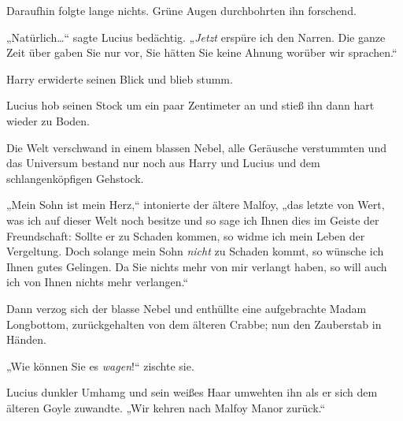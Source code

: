Daraufhin folgte lange nichts. Grüne Augen durchbohrten ihn forschend.

„Natürlich…“ sagte Lucius bedächtig. „\emph{Jetzt} erspüre ich den Narren. Die ganze Zeit über gaben Sie nur vor, Sie hätten Sie keine Ahnung worüber wir sprachen.“

Harry erwiderte seinen Blick und blieb stumm.

Lucius hob seinen Stock um ein paar Zentimeter an und stieß ihn dann hart wieder zu Boden.

Die Welt verschwand in einem blassen Nebel, alle Geräusche verstummten und das Universum bestand nur noch aus Harry und Lucius und dem schlangenköpfigen Gehstock.

„Mein Sohn ist mein Herz,“ intonierte der ältere Malfoy, „das letzte von Wert, was ich auf dieser Welt noch besitze und so sage ich Ihnen dies im Geiste der Freundschaft: Sollte er zu Schaden kommen, so widme ich mein Leben der Vergeltung. Doch solange mein Sohn \emph{nicht} zu Schaden kommt, so wünsche ich Ihnen gutes Gelingen. Da Sie nichts mehr von mir verlangt haben, so will auch ich von Ihnen nichts mehr verlangen.“

Dann verzog sich der blasse Nebel und enthüllte eine aufgebrachte Madam Longbottom, zurückgehalten von dem älteren Crabbe; nun den Zauberstab in Händen.

„Wie können Sie es \emph{wagen}!“ zischte sie.

Lucius dunkler Umhamg und sein weißes Haar umwehten ihn als er sich dem älteren Goyle zuwandte. „Wir kehren nach Malfoy Manor zurück.“

